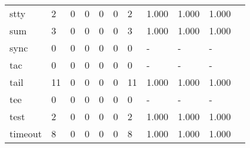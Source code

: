 \begin{longtable}{lp{1.10cm}p{1.10cm}p{1.10cm}p{1.10cm}p{1.10cm}p{1.10cm}p{1.10cm}p{1.10cm}p{1.10cm}p{1.10cm}}
stty      &                      2 &                                  0 &                                 0 &                                0 &                                 0 &                               2 &                          1.000 &                                 1.000 &                               1.000 \\
sum       &                      3 &                                  0 &                                 0 &                                0 &                                 0 &                               3 &                          1.000 &                                 1.000 &                               1.000 \\
sync      &                      0 &                                  0 &                                 0 &                                0 &                                 0 &                               0 &                              - &                                     - &                                   - \\
tac       &                      0 &                                  0 &                                 0 &                                0 &                                 0 &                               0 &                              - &                                     - &                                   - \\
tail      &                     11 &                                  0 &                                 0 &                                0 &                                 0 &                              11 &                          1.000 &                                 1.000 &                               1.000 \\
tee       &                      0 &                                  0 &                                 0 &                                0 &                                 0 &                               0 &                              - &                                     - &                                   - \\
test      &                      2 &                                  0 &                                 0 &                                0 &                                 0 &                               2 &                          1.000 &                                 1.000 &                               1.000 \\
timeout   &                      8 &                                  0 &                                 0 &                                0 &                                 0 &                               8 &                          1.000 &                                 1.000 &                               1.000 \\

\end{longtable}
